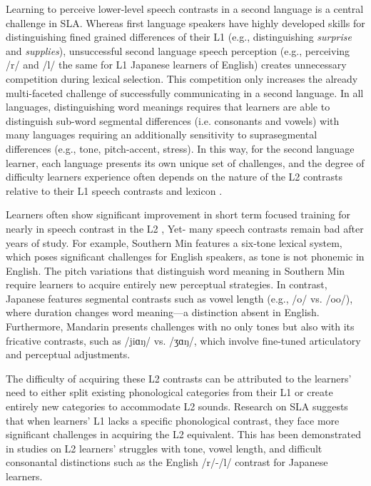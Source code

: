 Learning to perceive lower-level speech contrasts in a second language is a central challenge in SLA. Whereas first language speakers have highly developed skills for distinguishing fined grained differences of their L1 (e.g., distinguishing \textit{surprise} and \textit{supplies}), unsuccessful second language speech perception (e.g., perceiving /r/ and /l/ the same for L1 Japanese learners of English) creates unnecessary competition during lexical selection. This competition only increases the already multi-faceted challenge of successfully communicating in a second language. In all languages, distinguishing word meanings requires that learners are able to distinguish sub-word segmental differences (i.e. consonants and vowels) with many languages requiring an additionally sensitivity to suprasegmental differences (e.g., tone, pitch-accent, stress). In this way, for the second language learner, each language presents its own unique set of challenges, and the degree of difficulty learners experience often depends on the nature of the L2 contrasts relative to their L1 speech contrasts and lexicon \parencite{Flege1995,Best1995,BestTyler2007}.

Learners often show significant improvement in short term focused training for nearly in speech contrast in the L2 \cite[e.g.,]{}, Yet- many speech contrasts remain bad after years of study. For example, Southern Min features a six-tone lexical system, which poses significant challenges for English speakers, as tone is not phonemic in English. The pitch variations that distinguish word meaning in Southern Min require learners to acquire entirely new perceptual strategies. In contrast, Japanese features segmental contrasts such as vowel length (e.g., /o/ vs. /oo/), where duration changes word meaning—a distinction absent in English. Furthermore, Mandarin presents challenges with no only tones but also with its fricative contrasts, such as /jiɑŋ/ vs. /ʒɑŋ/, which involve fine-tuned articulatory and perceptual adjustments.

The difficulty of acquiring these L2 contrasts can be attributed to the learners’ need to either split existing phonological categories from their L1 or create entirely new categories to accommodate L2 sounds. Research on SLA suggests that when learners' L1 lacks a specific phonological contrast, they face more significant challenges in acquiring the L2 equivalent. This has been demonstrated in studies on L2 learners' struggles with tone, vowel length, and difficult consonantal distinctions such as the English /r/-/l/ contrast for Japanese learners.

